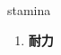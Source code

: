 
\begin{frame}
{\huge stamina}
\begin{center}
\begin{enumerate}\Large
  \item \textbf{耐力}
\end{enumerate}
\end{center}
\end{frame}
